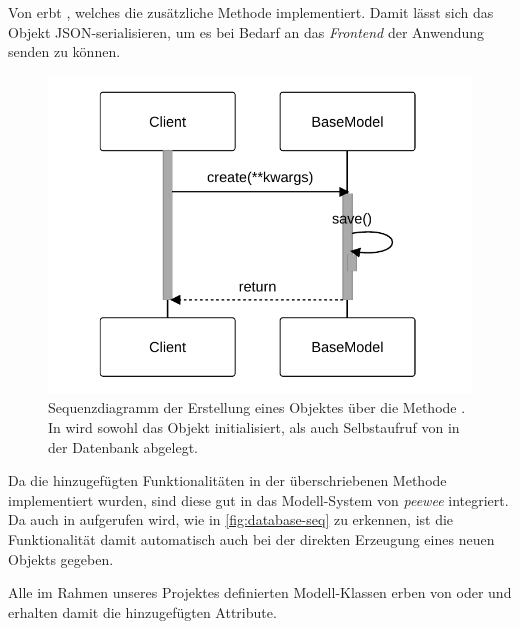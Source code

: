 Von  erbt , welches die zusätzliche Methode  implementiert. Damit lässt sich das Objekt JSON-serialisieren, um es bei Bedarf an das \emph{Frontend} der Anwendung senden zu können.

\begin{figure}[!ht]
	\centering
	\includegraphics[width=0.55\linewidth]{images/diagrams/database-seq.pdf}
	\caption{Sequenzdiagramm der Erstellung eines Objektes über die Methode . In  wird sowohl das Objekt initialisiert, als auch Selbstaufruf von  in der Datenbank abgelegt.}
	\label{fig:database-seq}
\end{figure}

Da die hinzugefügten Funktionalitäten in der überschriebenen Methode  implementiert wurden, sind diese gut in das Modell-System von \emph{peewee} integriert. Da  auch in  aufgerufen wird, wie in \autoref{fig:database-seq} zu erkennen, ist die Funktionalität damit automatisch auch bei der direkten Erzeugung eines neuen Objekts gegeben.

Alle im Rahmen unseres Projektes definierten Modell-Klassen erben von  oder  und erhalten damit die hinzugefügten Attribute.